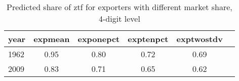 \begin{table}[htbp]
\caption{\label{clabel} Predicted share of ztf for exporters with different market share, 4-digit level}\centering\medskip
\begin{tabular}{|l|c|c|c|c|c|}\hline  
 \multicolumn{1}{c}{ year }  & expmean  & exponepct  & exptenpct  & exptwostdv  \\ \hline  
     1962 &      0.95 &      0.80 &      0.72 &      0.69 \\ \hline 
     2009 &      0.83 &      0.71 &      0.65 &      0.62 \\ \hline 
  \end{tabular}
\end{table}
